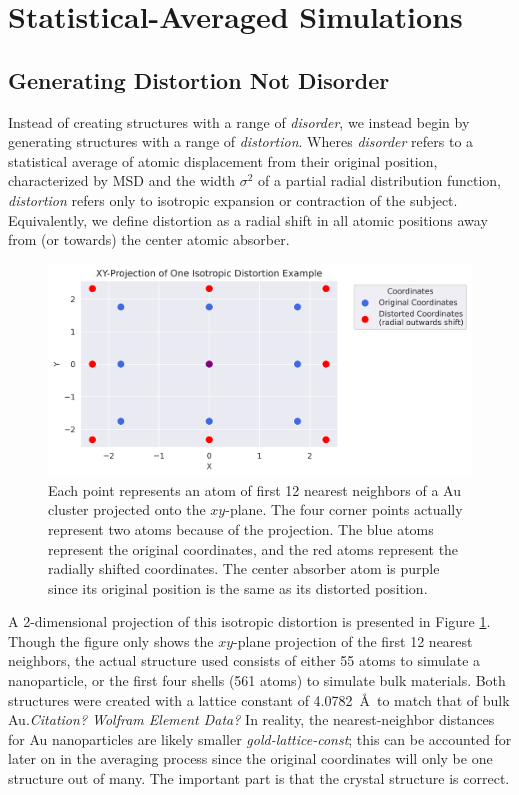 \section{Statistical-Averaged Simulations}

\subsection{Generating Distortion Not Disorder} \label{sec:start-disorder}
Instead of creating structures with a range of \textit{disorder}, we instead begin by generating structures with a range of \textit{distortion}. Wheres \textit{disorder} refers to a statistical average of atomic displacement from their original position, characterized by MSD and the width $ \sigma^2 $ of a partial radial distribution function, \textit{distortion} refers only to isotropic expansion or contraction of the subject. Equivalently, we define distortion as a radial shift in all atomic positions away from (or towards) the center atomic absorber.

\begin{figure}[h]
	\centering
	\includegraphics[width=\linewidth]{Chapters/Figures/2d_distortion_example.png}
	\caption[2D Distortion]{Each point represents an atom of first 12 nearest neighbors of a Au cluster projected onto the $xy$\nobreakdash-plane. The four corner points actually represent two atoms because of the projection. The blue atoms represent the original coordinates, and the red atoms represent the radially shifted coordinates. The center absorber atom is purple since its original position is the same as its distorted position.}
	\label{fig:2d-distortion}
\end{figure}

A 2-dimensional projection of this isotropic distortion is presented in Figure \ref{fig:2d-distortion}. Though the figure only shows the $xy$\nobreakdash-plane projection of the first 12 nearest neighbors, the actual structure used consists of either 55 atoms to simulate a nanoparticle, or the first four shells (561 atoms) to simulate bulk materials. Both structures were created with a lattice constant of 4.0782~\AA~to match that of bulk Au.\textit{Citation? Wolfram Element Data?} In reality, the nearest-neighbor distances for Au nanoparticles are likely smaller \textit{gold-lattice-const}; this can be accounted for later on in the averaging process since the original coordinates will only be one structure out of many. The important part is that the crystal structure is correct. 

